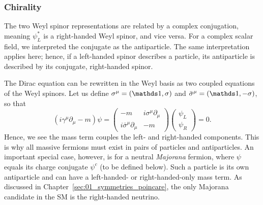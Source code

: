 \subsubsection{Chirality}

The two Weyl spinor representations are related by a complex conjugation, meaning $\psi_L^*$ is a right-handed Weyl spinor, and vice versa.
For a complex scalar field, we interpreted the conjugate as the antiparticle.
The same interpretation applies here; hence, if a left-handed spinor describes a particle, its antiparticle is described by its conjugate, right-handed spinor.

The Dirac equation can be rewritten in the Weyl basis as two coupled equations of the Weyl spinors.
Let us define $\sigma^\mu = (\identity, \cvec{\sigma})$ and $\bar{\sigma}^\mu = (\identity, -\cvec{\sigma})$, so that
\begin{equation}
	\label{eq:01_qft_spinors_dirac_weyl}
	(i\gamma^\mu\partial_\mu - m)\psi = 
	\begin{pmatrix} 
		-m & i\sigma^\mu\partial_\mu \\ i\bar{\sigma}^\mu\partial_\mu & -m 
	\end{pmatrix}
	\begin{pmatrix} \psi_L \\ \psi_R \end{pmatrix} = 0.
\end{equation}
Hence, we see the mass term couples the left- and right-handed components. 
This is why all massive fermions must exist in pairs of particles and antiparticles.
An important special case, however, is for a neutral \textit{Majorana} fermion, where $\psi$ equals its charge conjugate $\psi^c$ (to be defined below). 
Such a particle is its own antiparticle and can have a left-handed- or right-handed-only mass term.
As discussed in Chapter~\ref{sec:01_symmetries_poincare}, the only Majorana candidate in the SM is the right-handed neutrino.

